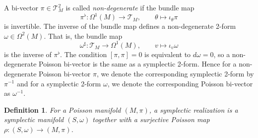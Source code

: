 \documentclass{amsart}
\newtheorem{definition}[theorem]{Definition}
\numberwithin{equation}{section}
\newcommand{\cT}{\mathcal{T}}
\begin{document}
A bi-vector $\pi \in \cT^2_M$ is called \emph{non-degenerate} if the bundle map
\[\pi^\flat: \Omega^1(M) \to \cT_M, \qquad \theta \mapsto \iota_\theta \pi\]
is invertible.
The inverse of the bundle map defines a non-degenerate 2-form $\omega \in \Omega^2(M)$.
That is, the bundle map
\[\omega^\sharp: \cT_M \to \Omega^1(M), \qquad v \mapsto \iota_v \omega\]
is the inverse of $\pi^\flat$.
The condition $[\pi,\pi]=0$ is equivalent to $d\omega = 0$, so a non-degenerate Poisson bi-vector is the same as a symplectic 2-form.
Hence for a non-degenerate Poisson bi-vector $\pi$, we denote the corresponding symplectic 2-form by $\pi^{-1}$ and for a symplectic 2-form $\omega$, we denote the corresponding Poisson bi-vector as $\omega^{-1}$.

\begin{definition}
  For a Poisson manifold $(M, \pi)$, a symplectic realization is a symplectic manifold $(S, \omega)$ together with a surjective Poisson map $\rho: (S, \omega) \to (M, \pi)$.
\end{definition}
\end{document}
